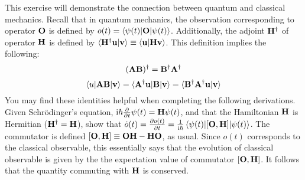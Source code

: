 



\bigskip {}
This exercise will demonstrate the connection between 
quantum and classical mechanics.
Recall that in quantum mechanics, the observation corresponding
to operator $\bf O$ is defined by $o(t) = \left\langle\psi(t) \lvert {\bf O} \rvert \psi(t)\right\rangle$. 
Additionally, the adjoint $\bf{H}^\dag$ of operator $\bf{H}$ is defined by 
$\langle \bf{H}^\dag u | v \rangle \equiv \langle u | \bf{H} v \rangle$.
This definition implies the following:
\[ (\bf{A} \bf{B})^\dag = \bf{B}^\dag \bf{A}^\dag \]
\[ \langle u | \bf{A} \bf{B} | v \rangle 
 = \langle \bf{A}^\dag u | \bf{B} | v \rangle 
 = \langle \bf{B}^\dag \bf{A}^\dag u | v \rangle \]
You may find these identities helpful 
when completing the following derivations. \\

\smallskip\subp
Given Schr\"odinger's equation,
${\rm i} \hbar \frac{\partial}{\partial t} \psi(t) = {\bf H} \psi(t)$,
and that the Hamiltonian $\bf{H}$ is Hermitian (${\bf H}^\dag={\bf H}$), 
show that $\dot o(t) = \frac{\partial o(t)}{\partial t} = \frac{1}{{\rm i}\hbar} \left\langle\psi(t) \lvert {\bf [{\bf O}, {\bf H}]} \rvert \psi(t)\right\rangle$.
The commutator is defined 
${[{\bf O}, {\bf H}]} \equiv {\bf OH - HO}$, as usual.
Since $o(t)$ corresponds to the classical observable,
this essentially says that the evolution of classical observable
is given by the the expectation value of commutator $[{\bf O}, {\bf H}]$.
It follows that the quantity commuting with $\bf H$ is conserved.

